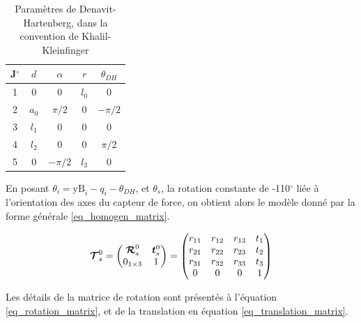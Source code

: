 \begin{appendices}
	\begin{table}[htbp] 
		\begin{center}
			\begin{tabular}{|c|c|c|c|c|}
				\hline
				J$^{\circ}$ & $ d $ & $ \alpha $ & $ r $ & $ \theta_{DH} $ \\
				\hline
				1 & 0    & 0        & $l_0$ & 0\\
				2 & $a_0$& $\pi/2$  & 0     & $-\pi/2$\\
				3 & $l_1$& 0        & 0     & 0 \\
				4 & $l_2$& 0        & 0     & $\pi/2$\\
				5 & 0    & $-\pi/2$ & $l_3$ & 0\\
				\hline
			\end{tabular}
		\end{center}
		\caption{Paramètres de Denavit-Hartenberg, dans la convention de Khalil-Kleinfinger}
		\label{tab_DH_params}	
	\end{table}
	
	En posant $ \theta_i = \text{yB}_i - q_i - \theta_{DH} $, et $ \theta_s $, la rotation constante de -110$^{\circ}$ liée à l'orientation des axes du capteur de force,  on obtient alors le modèle donné par la forme générale \cref{eq_homogen_matrix}. 
	
	\begin{equation} \label{eq_homogen_matrix}
		\matrCal{T}_s^0 =
		\begin{pmatrix}
			\matrCal{R}^0_s & \vect{t}^0_s \\ 0_{1\times 3} & 1 \\
		\end{pmatrix} = 
		\begin{pmatrix}
			 r_{11} & r_{12} & r_{13} & t_{1} \\
			 r_{21} & r_{22} & r_{23} & t_{2} \\
			 r_{31} & r_{32} & r_{33} & t_{3} \\
			 0 & 0 & 0 & 1 \\
		\end{pmatrix}
	\end{equation}
	
	Les détails de la matrice de rotation sont présentés à l'équation \cref{eq_rotation_matrix}, et de la translation en équation \cref{eq_translation_matrix}.
	

\end{appendices}
